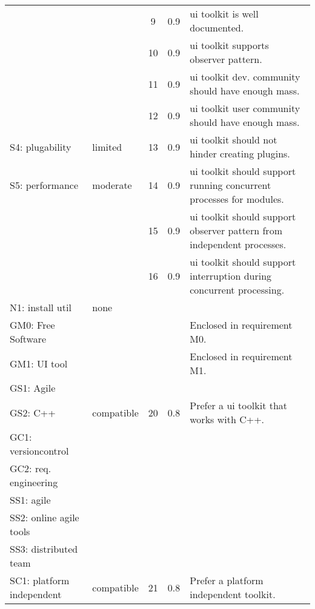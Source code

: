 \begin{center}
\begin{longtable}{ll||ccp{13em}}
	                         &              &  9  & 0.9 & ui toolkit is well documented.\\
	                         &              & 10  & 0.9 & ui toolkit supports observer pattern.\\
	                         &              & 11  & 0.9 & ui toolkit dev. community should have enough mass.\\
	                         &              & 12  & 0.9 & ui toolkit user community should have enough mass.\\
        S4: plugability      & limited      & 13  & 0.9 & ui toolkit should not hinder creating plugins.\\
        S5: performance	     & moderate     & 14  & 0.9 & ui toolkit should support running concurrent processes for modules.\\
	                         &              & 15  & 0.9 & ui toolkit should support observer pattern from independent processes.\\
	                         &              & 16  & 0.9 & ui toolkit should support interruption during concurrent processing.\\
        N1: install util          & none         &     &     & \\\hline
		GM0: Free Software  &              &     &     & Enclosed in requirement M0.\\
        GM1: UI tool	    &              &     &     & Enclosed in requirement M1.\\
        GS1: Agile	        &              &     &     & \\
        GS2: C++	        & compatible   & 20  & 0.8 & Prefer a ui toolkit that works with C++.\\
        GC1: versioncontrol &              &     &     & \\
        GC2: req. engineering
						    &              &     &     & \\\hline
        SS1: agile	        &              &     &     & \\
        SS2: online agile tools
							&              &     &     & \\
        SS3: distributed team
							&              &     &     & \\
        SC1: platform independent
							& compatible	 & 21  & 0.8 & Prefer a platform independent toolkit.\\
    \end{longtable}
    \label{tab: uitool-requirements}
\end{center}
